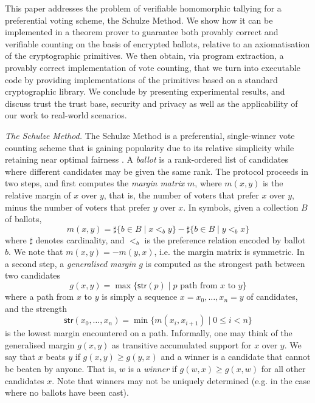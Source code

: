 \documentclass{llncs}
\newcommand{\str}{\mathsf{str}}
\begin{document}
This paper addresses the problem of verifiable homomorphic tallying
for a preferential voting scheme, the Schulze Method. We show
how it can be implemented in a theorem prover to
guarantee both provably correct and verifiable counting on the basis
of encrypted ballots, relative to an axiomatisation of the
cryptographic primitives. We then obtain, via program extraction, a
provably correct implementation of vote counting, that we turn
into executable code by providing implementations of the primitives
based on a standard cryptographic library. We conclude by presenting
experimental results, and discuss trust the trust base, security and
privacy as well as the applicability of our work to real-world
scenarios. 

  \smallskip\noindent\emph{The Schulze Method.} The Schulze Method
  \cite{Schulze:2011:NMC} is a preferential, single-winner vote
  counting scheme that is gaining popularity due to its relative
  simplicity while retaining near optimal fairness
  \cite{Rivest:2010:OSW}.  
  A \emph{ballot} is a rank-ordered list of
  candidates where different candidates may be given the same rank.
  The protocol proceeds in two steps, and first computes the
  \emph{margin matrix} $m$, where $m(x, y)$ is the relative margin
  of $x$ over $y$, that is, the number of voters that prefer $x$
  over $y$, minus the number of voters that prefer $y$ over $x$. In
  symbols, given a collection $B$ of ballots, 
  \[ m(x, y) = \sharp\lbrace b \in B \mid x <_b y \rbrace
             - \sharp \lbrace b \in B \mid y <_b x \rbrace
  \]
  where $\sharp$ denotes cardinality, and $<_b$  is the preference
  relation encoded by ballot $b$. 
  We note that $m(x, y) = -m(y, x)$, i.e. the margin matrix is
  symmetric. In a second step, a \emph{generalised margin} $g$ is
  computed as the strongest path between two candidates
  \[ g(x,y) = \max \lbrace \str(p) \mid p \mbox{ path from $x$ to
  $y$} \rbrace \]
  where a path from $x$ to $y$ is simply a sequence $x = x_0, \dots,
  x_n = y$ of candidates, and the strength
  \[ \str(x_0, \dots, x_n) = \min \lbrace m(x_i, x_{i+1}) \mid 0
  \leq i < n
  \rbrace  \]
  is the lowest margin encountered on a path.
  Informally, one may think of the
  generalised margin $g(x, y)$ as transitive accumulated support for
  $x$ over $y$. We say that $x$ beats $y$ if $g(x,y) \geq g(y, x)$ and a
  winner is a candidate that cannot be beaten by anyone. 
  That is, $w$ is a \emph{winner} if $g(w, x) \geq g(x, w)$ for
  all other candidates $x$. Note that
  winners may not be uniquely determined (e.g. in the case where no
  ballots have been cast).
\end{document}
